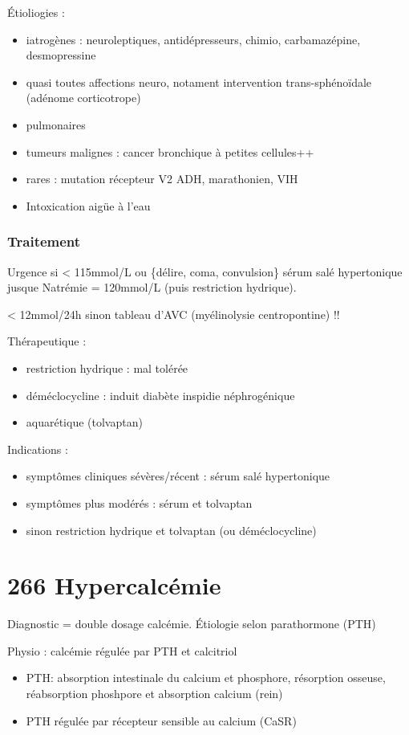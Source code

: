 \documentclass{book}
\begin{document}
Étioliogies :
\begin{itemize}
\item iatrogènes : neuroleptiques, antidépresseurs, chimio, carbamazépine,
desmopressine
\item quasi toutes affections neuro, notament intervention trans-sphénoïdale
(adénome corticotrope)
\item pulmonaires
\item tumeurs malignes : cancer bronchique à petites cellules++
\item rares : mutation récepteur V2 ADH, marathonien, VIH
\item Intoxication aigüe à l'eau
\end{itemize}

\subsubsection{Traitement}
\label{sec:org6ce3093}
Urgence si < 115mmol/L ou \{délire, coma, convulsion\} \faBomb \thus sérum salé
hypertonique jusque Natrémie = 120mmol/L (puis restriction hydrique).

\danger{} < 12mmol/24h sinon tableau d'AVC (myélinolysie centropontine) !! \faBomb

Thérapeutique :
\begin{itemize}
\item restriction hydrique : mal tolérée
\item déméclocycline : induit diabète inspidie néphrogénique
\item aquarétique (tolvaptan)
\end{itemize}

Indications :
\begin{itemize}
\item symptômes cliniques sévères/récent : sérum salé hypertonique
\item symptômes plus modérés : sérum et tolvaptan
\item sinon restriction hydrique et tolvaptan (ou déméclocycline)
\end{itemize}
\section{266 \textdagger{} Hypercalcémie}
\label{sec:org1976452}
Diagnostic = double dosage calcémie. Étiologie selon parathormone (PTH)

Physio : calcémie régulée par PTH et calcitriol
\begin{itemize}
\item PTH: \inc absorption intestinale du calcium et phosphore, \inc résorption
osseuse, \dec réabsorption phoshpore et \inc absorption calcium (rein)
\item PTH régulée par récepteur sensible au calcium (CaSR)
\end{itemize}
\end{document}
